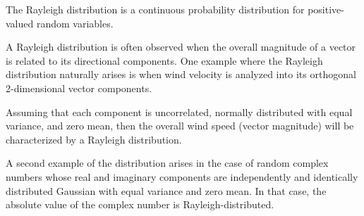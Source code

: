 



The Rayleigh distribution is a continuous probability distribution for positive-valued random variables.

A Rayleigh distribution is often observed when the overall magnitude of a vector is related to its directional components. One example where the Rayleigh distribution naturally arises is when wind velocity is analyzed into its orthogonal 2-dimensional vector components. 

Assuming that each component is uncorrelated, normally distributed with equal variance, and zero mean, then the overall wind speed (vector magnitude) will be characterized by a Rayleigh distribution. 

A second example of the distribution arises in the case of random complex numbers whose real and imaginary components are independently and identically distributed Gaussian with equal variance and zero mean. In that case, the absolute value of the complex number is Rayleigh-distributed.





